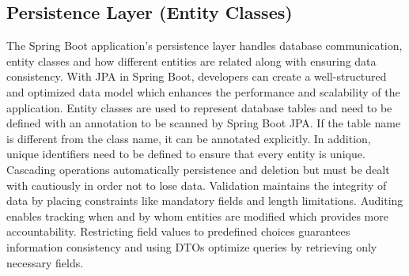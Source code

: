     \subsection{Persistence Layer (Entity Classes)}
    The Spring Boot application's persistence layer handles database communication, entity classes and how different entities are related along with ensuring data consistency. With JPA in Spring Boot, developers can create a well-structured and optimized data model which enhances the performance and scalability of the application. \newline
    Entity classes are used to represent database tables and need to be defined with an annotation to be scanned by Spring Boot JPA. If the table name is different from the class name, it can be annotated explicitly. In addition, unique identifiers need to be defined to ensure that every entity is unique.\newline
    Cascading operations automatically persistence and deletion but must be dealt with cautiously in order not to lose data. Validation maintains the integrity of data by placing constraints like mandatory fields and length limitations.\newline
    Auditing enables tracking when and by whom entities are modified which provides more accountability. Restricting field values to predefined choices guarantees information consistency and using DTOs optimize queries by retrieving only necessary fields.

